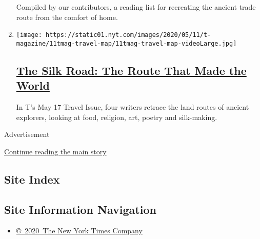 \begin{enumerate}
  Compiled by our contributors, a reading list for recreating the
  ancient trade route from the comfort of home.
\item
  \texttt{[image: https://static01.nyt.com/images/2020/05/11/t-magazine/11tmag-travel-map/11tmag-travel-map-videoLarge.jpg]}

  \hypertarget{the-silk-road-the-route-that-made-the-world}{%
  \subsection{\texorpdfstring{\href{/2020/05/11/t-magazine/the-silk-road.html}{The
  Silk Road: The Route That Made the
  World}}{The Silk Road: The Route That Made the World}}\label{the-silk-road-the-route-that-made-the-world}}

  In T's May 17 Travel Issue, four writers retrace the land routes of
  ancient explorers, looking at food, religion, art, poetry and
  silk-making.
\end{enumerate}

Advertisement

\protect\hyperlink{after-mid1}{Continue reading the main story}

\hypertarget{site-index}{%
\subsection{Site Index}\label{site-index}}

\hypertarget{site-information-navigation}{%
\subsection{Site Information
Navigation}\label{site-information-navigation}}

\begin{itemize}
\tightlist
\item
  \href{https://help.nytimes.com/hc/en-us/articles/115014792127-Copyright-notice}{©~2020~The
  New York Times Company}
\end{itemize}

